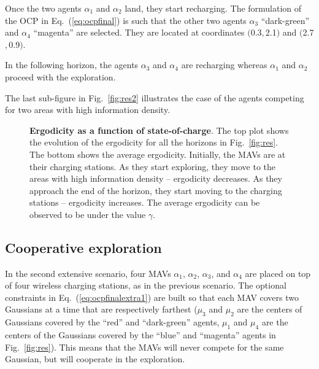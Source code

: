 \documentclass[letterpaper,10pt,conference,twoside]{IEEEtran}
\theoremstyle{definition}
\begin{document}
Once the two agents $\alpha_1$ and $\alpha_2$ land, they start recharging. The formulation of the OCP in Eq.~(\ref{eq:ocpfinal}) is such that the other two agents $\alpha_3$ ``dark-green'' and $\alpha_4$ ``magenta'' are selected. They are located at coordinates $($0.3$,$2.1$)$ and $($2.7$,$0.9$)$.%

In the following horizon, the agents $\alpha_3$ and $\alpha_4$ are recharging whereas $\alpha_1$ and $\alpha_2$ proceed with the exploration. %

The last sub-figure in Fig.~\ref{fig:res2} illustrates the case of the agents competing for two areas with high information density.

\begin{figure}[t!]
  \begin{minipage}[t!]{.5\columnwidth}
    \vspace*{-.2cm}
    
  \end{minipage}
  \begin{minipage}[c]{.48\columnwidth}
    \vspace*{.05cm}
    \caption{\textbf{Ergodicity %
    as a function of state-of-charge}. The top plot shows the evolution of the ergodicity for all the horizons in Fig.~\ref{fig:res}. The bottom shows the average ergodicity. Initially, the MAVs are at their charging stations. As they start exploring, they move to the areas with high information density -- ergodicity decreases. As they approach the end of the horizon, they start moving to the charging stations -- ergodicity increases. The average ergodicity can be observed to be under the value $\gamma$.}
    \label{fig:ergo}
  \end{minipage}
  \vspace*{-.4cm}
\end{figure}

\subsection*{Cooperative exploration}
\noindent
In the second extensive scenario, four MAVs $\alpha_1$, $\alpha_2$, $\alpha_3$, and $\alpha_4$ are placed on top of four wireless charging stations, as in the previous scenario. The optional constraints in Eq.~(\ref{eq:ocpfinalextra1}) are built so that each MAV covers two Gaussians at a time that are respectively farthest ($\mu_3$ and $\mu_2$ are the centers of Gaussians covered by the ``red'' and ``dark-green'' agents, $\mu_1$ and $\mu_4$ are the centers of the Gaussians covered by the ``blue'' and ``magenta'' agents in Fig.~\ref{fig:res}). This means that the MAVs will never compete for the same Gaussian, but will cooperate in the exploration. %
\end{document}
